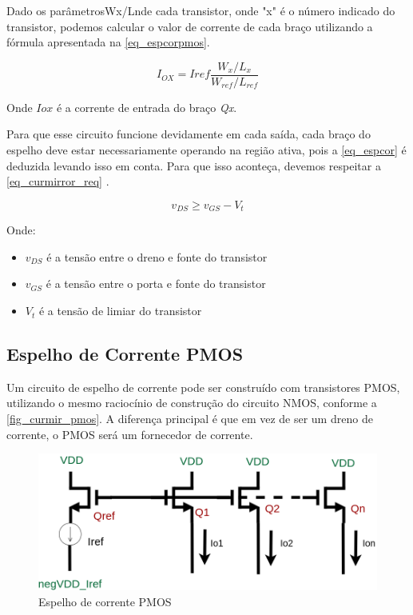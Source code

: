 Dado os parâmetrosWx/Lnde cada transistor, onde "x" é o número indicado do transistor, podemos calcular o valor de corrente de cada braço utilizando a fórmula apresentada na \autoref{eq_espcorpmos}.

\begin{equation}
    \label{eq_espcor}
    I_{OX} = Iref\frac{W_x/L_x}{W_{ref}/L_{ref}}
\end{equation}

Onde $I{ox}$ \'e a corrente de entrada do bra{\c c}o \emph{Qx}. 

Para que esse circuito funcione devidamente em cada sa\'ida, cada bra{\c c}o do espelho deve estar necessariamente operando na regi\~ao ativa, pois a \autoref{eq_espcor} \'e deduzida levando isso em conta. Para que isso aconte{\c c}a, devemos respeitar a \autoref{eq_curmirror_req} \cite{RazaviFundM}.

\begin{equation}
    \label{eq_curmirror_req}
    v_{DS} \geq v_{GS} - V_t
\end{equation}

Onde:

\begin{itemize}
    \item $v_{DS}$ \'e a tens\~ao entre o dreno e fonte do transistor
    \item $v_{GS}$ \'e a tens\~ao entre o porta e fonte do transistor
    \item $V_{t}$ \'e a tens\~ao de limiar do transistor
\end{itemize}

\subsection{Espelho de Corrente PMOS}

Um circuito de espelho de corrente pode ser constru\'ido com transistores PMOS, utilizando o mesmo racioc\'inio de constru{\c c}\~ao do circuito NMOS, conforme a \autoref{fig_curmir_pmos}. A diferen{\c c}a principal \'e que em vez de ser um dreno de corrente, o PMOS ser\'a um fornecedor de corrente.

\begin{figure}[htb]
    \label{fig_cur}
    \centering
    \caption{Espelho de corrente PMOS} 
    \includegraphics[scale=0.4]{Circuitos/current_mirror_example_pmos.png}
\end{figure}

